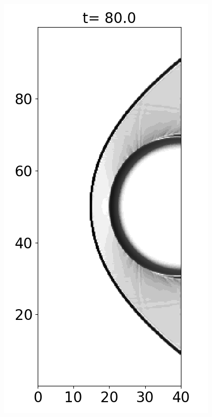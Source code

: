\documentclass[preprint, 11pt]{article}
\begin{document}
\begin{figure}[!h]
  {\scriptsize
    \includegraphics[scale=0.3]{figures/cylinder_HLLE.png}
    \qquad \qquad \qquad
}
\end{figure}
\end{document}
